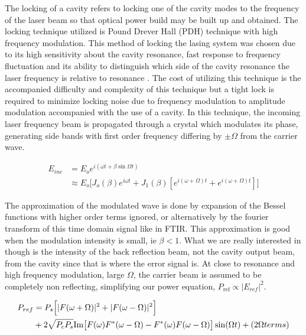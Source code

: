 \documentclass[a4paper]{book}
\begin{document}
		The locking of a cavity refers to locking one of the cavity modes to the frequency of the laser beam so that optical power build may be built up and obtained.
		The locking technique utilized is Pound Drever Hall (PDH) technique with high frequency modulation. This method of locking the lasing system was chosen due to its high sensitivity about the cavity resonance, fast response to frequency fluctuation and its ability to distinguish which side of the cavity resonance the laser frequency is relative to resonance \cite{PDH Intro}. The cost of utilizing this technique is the accompanied difficulty and complexity of this technique but a tight lock is required to minimize locking noise due to frequency modulation to amplitude modulation accompanied with the use of a cavity. In this technique, the incoming laser frequency beam is propagated through a crystal which modulates its phase, generating side bands with first order frequency differing by $\pm \Omega$ from the carrier wave.
		
		\begin{equation}
			\begin{split}
			E_{inc} & = E_o e^{i(\omega t + \beta\sin{\Omega t})}\\
			& \approx E_o \Big[J_o(\beta) e^{i\omega t} 
			+J_1(\beta)[e^{i(\omega +\Omega)t} +e^{i(\omega + \Omega)t}]\Big]
			\end{split}
		\end{equation}
		
		The approximation of the modulated wave is done by expansion of the Bessel functions with higher order terms ignored, or alternatively by the fourier transform of this time domain signal like in FTIR. This approximation is good when the modulation intensity is small, ie $\beta < 1$. What we are really interested in though is the intensity of the back reflection beam, not the cavity output beam, from the cavity since that is where the error signal is. At close to resonance and high frequency modulation, large $\Omega$, the carrier beam is assumed to be completely non reflecting, simplifying our power equation, $P_{\text{ref}}\propto |E_{ref}|^2$.
		
		\begin{equation}
			\begin{split}
			P_{ref} & = P_s\Big[|F(\omega +\Omega)|^2+|F(\omega -\Omega)|^2\Big]\\
			& + 2\sqrt{P_c P_s} \space \text{Im}  \big[ F(\omega)F^*(\omega - \Omega)-F^*(\omega) F(\omega - \Omega) \big]\sin (\Omega t)+(2\Omega terms)\\
			\end{split}
		\end{equation}
		
\end{document}
